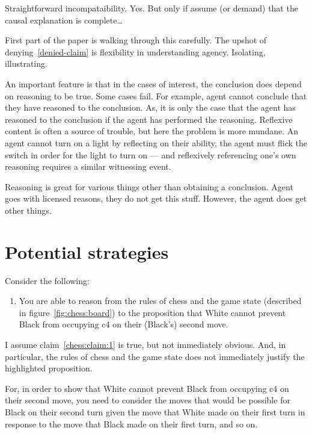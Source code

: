 \documentclass[10pt]{article}
\newcommand{\hozlinedash}[0]{%
  \noindent\hdashrule[0.5ex][c]{\textwidth}{.1pt}{2.5pt}
}
\begin{document}
Straightforward incompataibility.
Yes.
But only if assume (or demand) that the causal explanation is complete\dots




{
  \color{red}
  First part of the paper is walking through this carefully.
}
The upshot of denying~\ref{denied-claim} is flexibility in understanding agency.
Isolating, illustrating.



An important feature is that in the cases of interest, the conclusion does depend on reasoning to be true.
Some cases fail.
For example, agent cannot conclude that they have reasoned to the conclusion.
As, it is only the case that the agent has reasoned to the conclusion if the agent has performed the reasoning.
Reflexive content is often a source of trouble, but here the problem is more mundane.
An agent cannot turn on a light by reflecting on their ability, the agent must flick the switch in order for the light to turn on --- and reflexively referencing one's own reasoning requires a similar witnessing event.



Reasoning is great for various things other than obtaining a conclusion.
Agent goes with licensed reasons, they do not get this stuff.
However, the agent does get other things.





\hozlinedash

\section{Potential strategies}
\label{sec:potential-strategies}

Consider the following:
\begin{enumerate}
\item\label{chess:claim:1} You are able to reason from the rules of chess and the game state (described in figure~\ref{fig:chess:board}) to the proposition that White cannot prevent Black from occupying c4 on their (Black's) second move.
\end{enumerate}
I assume claim~\ref{chess:claim:1} is true, but not immediately obvious.
And, in particular, the rules of chess and the game state does not immediately justify the highlighted proposition.

For, in order to show that White cannot prevent Black from occupying c4 on their second move, you need to consider the moves that would be possible for Black on their second turn given the move that White made on their first turn in response to the move that Black made on their first turn, and so on.
\end{document}
